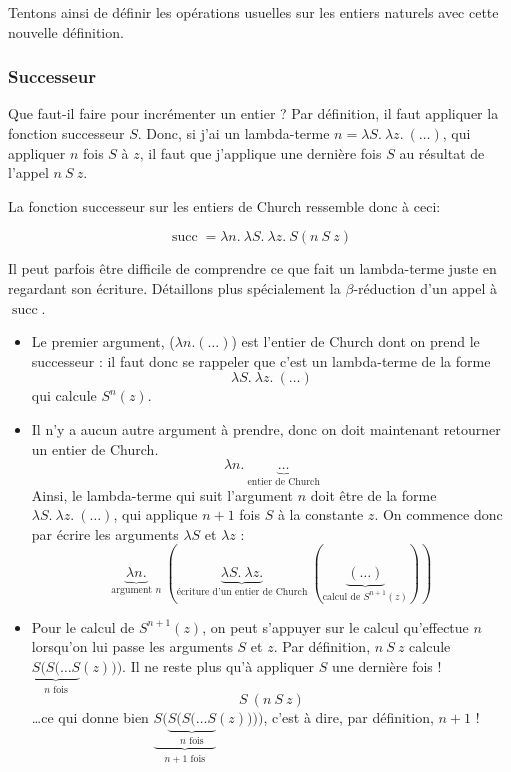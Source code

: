\documentclass[11pt]{article}
\begin{document}
\newpage
Tentons ainsi de définir les opérations usuelles sur les entiers naturels avec cette nouvelle définition.

\subsubsection{Successeur}

Que faut-il faire pour incrémenter un entier ? Par définition, il faut appliquer la fonction successeur $S$. Donc, si j'ai un lambda-terme $n=\lambda S.~\lambda z.~(\dots)$, qui appliquer $n$ fois $S$ à $z$, il faut que j'applique une dernière fois $S$ au résultat de l'appel $n~S~z$.

La fonction successeur sur les entiers de Church ressemble donc à ceci: 

$$\operatorname{succ} = \lambda n.~\lambda S.~\lambda z.~S \left(n~S~z\right)$$

Il peut parfois être difficile de comprendre ce que fait un lambda-terme juste en regardant son écriture. Détaillons plus spécialement la $\beta$-réduction d'un appel à $\operatorname{succ}$.
\begin{itemize}
    \item Le premier argument, ($\lambda n. (\dots) $) est l'entier de Church dont on prend le successeur : il faut donc se rappeler que c'est un lambda-terme de la forme $$\lambda S.~\lambda z.~ (\dots)$$ qui calcule $S^n(z)$.
    \item Il n'y a aucun autre argument à prendre, donc on doit maintenant retourner un entier de Church.
    $$\lambda n.~ \underbrace{\dots}_{\text{entier de Church}}$$
    Ainsi, le lambda-terme qui suit l'argument $n$ doit être de la forme $\lambda S.~\lambda z.~ (\dots)$, qui applique $n+1$ fois $S$ à la constante $z$. On commence donc par écrire les arguments $\lambda S$ et $\lambda z$ :
    $$\underbrace{\lambda n.}_\text{argument $n$}~\left(\underbrace{\lambda S.~\lambda z.}_\text{écriture d'un entier de Church}~\left(\underbrace{(\dots)}_\text{calcul de $S^{n+1}(z)$}\right)\right)$$

    \item Pour le calcul de $S^{n+1}(z)$, on peut s'appuyer sur le calcul qu'effectue $n$ lorsqu'on lui passe les arguments $S$ et $z$. Par définition, $n~S~z$ calcule $\underbrace{S(S(\dots S}_\text{$n$ fois}(z)))$. Il ne reste plus qu'à appliquer $S$ une dernière fois !
    $$S~(n~S~z)$$
    \dots ce qui donne bien $\underbrace{S(\underbrace{S(S(\dots S}_\text{$n$ fois}}_{\text{$n + 1$ fois}}(z))))$, c'est à dire, par définition, $\boxed{n+1}$ !
\end{itemize}
\end{document}
